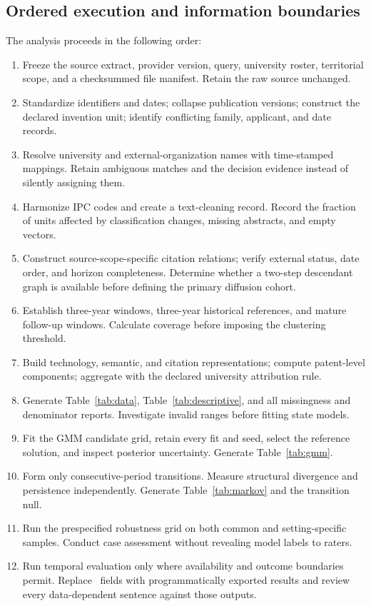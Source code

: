 \subsection{Ordered execution and information boundaries}
The analysis proceeds in the following order:
\begin{enumerate}
\item Freeze the source extract, provider version, query, university roster,
territorial scope, and a checksummed file manifest. Retain the raw source unchanged.
\item Standardize identifiers and dates; collapse publication versions; construct
the declared invention unit; identify conflicting family, applicant, and date records.
\item Resolve university and external-organization names with time-stamped mappings.
Retain ambiguous matches and the decision evidence instead of silently assigning them.
\item Harmonize IPC codes and create a text-cleaning record. Record the fraction
of units affected by classification changes, missing abstracts, and empty vectors.
\item Construct source-scope-specific citation relations; verify external status,
date order, and horizon completeness. Determine whether a two-step descendant
graph is available before defining the primary diffusion cohort.
\item Establish three-year windows, three-year historical references, and mature
follow-up windows. Calculate coverage before imposing the clustering threshold.
\item Build technology, semantic, and citation representations; compute patent-level
components; aggregate with the declared university attribution rule.
\item Generate Table~\ref{tab:data}, Table~\ref{tab:descriptive}, and all missingness
and denominator reports. Investigate invalid ranges before fitting state models.
\item Fit the GMM candidate grid, retain every fit and seed, select the reference
solution, and inspect posterior uncertainty. Generate Table~\ref{tab:gmm}.
\item Form only consecutive-period transitions. Measure structural divergence and
persistence independently. Generate Table~\ref{tab:markov} and the transition null.
\item Run the prespecified robustness grid on both common and setting-specific
samples. Conduct case assessment without revealing model labels to raters.
\item Run temporal evaluation only where availability and outcome boundaries permit.
Replace \TBD\ fields with programmatically exported results and review every
data-dependent sentence against those outputs.
\end{enumerate}

